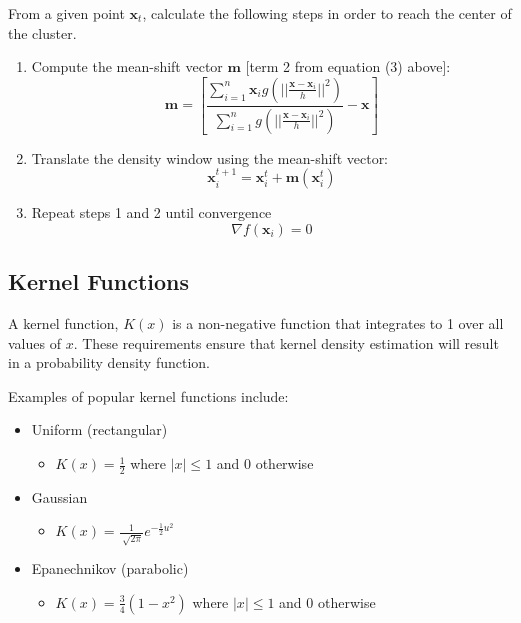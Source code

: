 \documentclass{article}
\begin{document}
From a given point $\mathbf{x}_t$, calculate the following steps in order to reach the center of the cluster.
\begin{enumerate}
	\item Compute the mean-shift vector $\mathbf{m}$ [term 2 from equation (3) above]:
    \begin{equation}
    \mathbf{m}=\left[\frac{\sum_{i=1}^n\mathbf{x}_ig\left(||\frac{\mathbf{x}-\mathbf{x}_i}{h}||^2\right)}{\sum_{i=1}^ng\left(||\frac{\mathbf{x}-\mathbf{x}_i}{h}||^2\right)}-\mathbf{x}\right]
    \end{equation}
    \item Translate the density window using the mean-shift vector:
    \begin{equation}
    \mathbf{x}_i^{t+1}=\mathbf{x}_i^t+\mathbf{m}(\mathbf{x}_i^t)
    \end{equation}
    \item Repeat steps 1 and 2 until convergence
    \begin{equation}
    \nabla f(\mathbf{x}_i)=0
    \end{equation}
\end{enumerate}

\subsection{Kernel Functions}

A kernel function, $K(x)$ is a non-negative function that integrates to 1 over all values of $x$. These requirements ensure that kernel density estimation will result in a probability density function.

Examples of popular kernel functions include:
\begin{itemize}
	\item Uniform (rectangular)
		\begin{itemize}
		\item $K(x)=\frac{1}{2}$ where $|x|\le1$ and 0 otherwise
		\end{itemize}
	\item Gaussian
		\begin{itemize}
		\item $K(x)=\frac{1}{\sqrt[]{2\pi}}e^{-\frac{1}{2}u^2}$
		\end{itemize}
	\item Epanechnikov (parabolic)
		\begin{itemize}
		\item $K(x)=\frac{3}{4}(1-x^2)$ where $|x|\le1$ and 0 otherwise
		\end{itemize}
\end{itemize}
\end{document}
